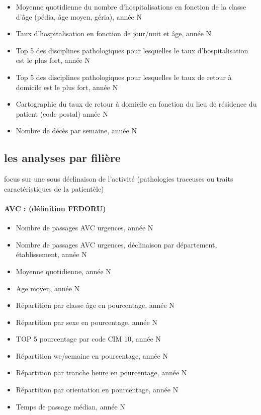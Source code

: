 \documentclass[]{article}
\begin{document}
\begin{itemize}
\itemsep1pt\parskip0pt
\item
  Moyenne quotidienne du nombre d'hospitalisations en fonction de la
  classe d'âge (pédia, âge moyen, géria), année N
\item
  Taux d'hospitalisation en fonction de jour/nuit et âge, année N
\item
  Top 5 des disciplines pathologiques pour lesquelles le taux
  d'hospitalisation est le plus fort, année N
\item
  Top 5 des disciplines pathologiques pour lesquelles le taux de retour
  à domicile est le plus fort, année N
\item
  Cartographie du taux de retour à domicile en fonction du lieu de
  résidence du patient (code postal) année N
\item
  Nombre de décès par semaine, année N
\end{itemize}

\subsection{les analyses par filière}\label{les-analyses-par-filiere}

focus sur une sous déclinaison de l'activité (pathologies traceuses ou
traits caractéristiques de la patientèle)

\paragraph{AVC : (définition FEDORU)}\label{avc-definition-fedoru}

\begin{itemize}
\itemsep1pt\parskip0pt
\item
  Nombre de passages AVC urgences, année N
\item
  Nombre de passages AVC urgences, déclinaison par département,
  établissement, année N
\item
  Moyenne quotidienne, année N
\item
  Age moyen, année N
\item
  Répartition par classe âge en pourcentage, année N
\item
  Répartition par sexe en pourcentage, année N
\item
  TOP 5 pourcentage par code CIM 10, année N
\item
  Répartition we/semaine en pourcentage, année N
\item
  Répartition par tranche heure en pourcentage, année N
\item
  Répartition par orientation en pourcentage, année N
\item
  Temps de passage médian, année N
\end{itemize}
\end{document}
